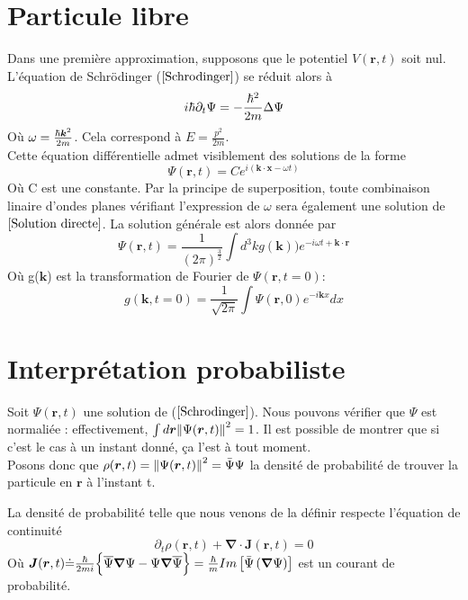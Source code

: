 \documentclass[../notesdecours]{subfiles}
\begin{document}
\section{Particule libre}

Dans une première approximation, supposons que le potentiel $V(\bm{r},t)$ soit nul. L'équation de Schrödinger ($\ref{Schrodinger}$) se réduit alors à
\begin{equation*}
i\hbar \partial_t \Psi = - \frac{\hbar^2}{2m} \Delta \Psi
\end{equation*}
Où $\omega = \frac{\hbar \bm{k}^2}{2m}$. Cela correspond à $E = \frac{p^2}{2m}$.\\

Cette équation différentielle admet visiblement des solutions de la forme
\begin{equation}
\label{Solution directe}
\Psi (\bm{r},t) = Ce^{i(\bm{k} \cdot \bm{x} - \omega t)}
\end{equation}
Où C est une constante. Par la principe de superposition, toute combinaison linaire d'ondes planes vérifiant l'expression de $\omega$ sera également une solution de $\ref{Solution directe}$. La solution générale est alors donnée par 
\begin{equation}
\label{Solution générale}
\Psi (\bm{r},t) = \frac{1}{\left( 2 \pi \right)^{\frac{3}{2}}}\int d^3k g(\bm{k})) e^{-i \omega t + \bm{k} \cdot \bm{r}}
\end{equation}
Où g($\bm{k}$) est la transformation de Fourier de $\Psi (\bm{r},t = 0)$:
\begin{equation}
g(\bm{k},t=0) = \frac{1}{\sqrt{2\pi}} \int \Psi (\bm{r},0)e^{-i\bm{k}x} dx
\end{equation}

\section{Interprétation probabiliste}

Soit $\Psi (\bm{r},t)$ une solution de ($\ref{Schrodinger}$). Nous pouvons vérifier que $\Psi$ est normaliée : effectivement, $\int d\bm{r} \norm{\Psi(\bm{r},t)}^2 = 1$. Il est possible de montrer que si c'est le cas à un instant donné, ça l'est à tout moment.\\

Posons donc que $\rho (\bm{r},t) = \norm{\Psi (\bm{r},t)}^2 = \bar{\Psi} \Psi$ la densité de probabilité de trouver la particule en $\bm{r}$ à l'instant t.\\

\begin{Property}
La densité de probabilité telle que nous venons de la définir respecte l'équation de continuité
\begin{equation}
\label{Equation de Continuité}
\partial_t \rho (\bm{r},t) + \bm{\nabla} \cdot \bm{J} (\bm{r},t) = 0
\end{equation}
Où $\bm{J} (\bm{r},t) \dot{=} \frac{\hbar}{2mi} \Big\{\overline{\Psi}\bm{\nabla}\Psi - \Psi\bm{\nabla}\overline{\Psi}\Big\} = \frac{\hbar}{m} Im \left[\bar{\Psi} \left(\bm{\nabla} \Psi\right)\right]$ est un courant de probabilité.\\
\end{Property}
\end{document}

